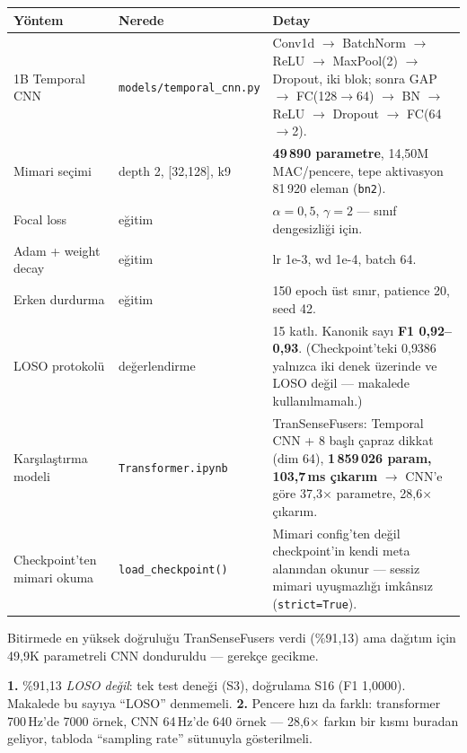 \documentclass[11pt,a4paper]{article}
\newcommand{\ms}{\,ms}
\newcommand{\kod}[1]{\texttt{\small #1}}
\newcommand{\dosya}[1]{\texttt{\footnotesize #1}}
\begin{document}
\begin{longtable}{@{}p{4.0cm}p{2.9cm}p{8.6cm}@{}}
\toprule
\textbf{Yöntem} & \textbf{Nerede} & \textbf{Detay} \\
\midrule
\endhead
1B Temporal CNN & \dosya{models/}\newline\dosya{temporal\_cnn.py} &
Conv1d $\rightarrow$ BatchNorm $\rightarrow$ ReLU $\rightarrow$ MaxPool(2)
$\rightarrow$ Dropout, iki blok; sonra GAP $\rightarrow$ FC(128$\to$64)
$\rightarrow$ BN $\rightarrow$ ReLU $\rightarrow$ Dropout $\rightarrow$ FC(64$\to$2). \\
\addlinespace
Mimari seçimi & depth 2, [32,128], k9 &
\textbf{49\,890 parametre}, 14{,}50M MAC/pencere, tepe aktivasyon 81\,920
eleman (\kod{bn2}). \\
\addlinespace
Focal loss & eğitim & $\alpha=0{,}5$, $\gamma=2$ --- sınıf dengesizliği için. \\
\addlinespace
Adam + weight decay & eğitim & lr 1e-3, wd 1e-4, batch 64. \\
\addlinespace
Erken durdurma & eğitim & 150 epoch üst sınır, patience 20, seed 42. \\
\addlinespace
LOSO protokolü & değerlendirme &
15 katlı. Kanonik sayı \textbf{F1 0{,}92--0{,}93}. (Checkpoint'teki 0{,}9386
yalnızca iki denek üzerinde ve LOSO değil --- makalede kullanılmamalı.) \\
\addlinespace
Karşılaştırma modeli & \dosya{Transformer.ipynb} &
TranSenseFusers: Temporal CNN + 8 başlı çapraz dikkat (dim 64),
\textbf{1\,859\,026 param, 103{,}7\ms{} çıkarım} $\rightarrow$ CNN'e göre
37{,}3$\times$ parametre, 28{,}6$\times$ çıkarım. \\
\addlinespace
Checkpoint'ten mimari okuma & \kod{load\_checkpoint()} &
Mimari config'ten değil checkpoint'in kendi meta alanından okunur ---
sessiz mimari uyuşmazlığı imkânsız (\kod{strict=True}). \\
\bottomrule
\end{longtable}

\begin{uyari}
Bitirmede en yüksek doğruluğu TranSenseFusers verdi (\%91{,}13) ama dağıtım
için 49{,}9K parametreli CNN donduruldu --- gerekçe gecikme.

\textbf{1.} \%91{,}13 \emph{LOSO değil}: tek test deneği (S3), doğrulama S16
(F1 1{,}0000). Makalede bu sayıya ``LOSO'' denmemeli.
\textbf{2.} Pencere hızı da farklı: transformer 700\,Hz'de 7000 örnek, CNN
64\,Hz'de 640 örnek --- 28{,}6$\times$ farkın bir kısmı buradan geliyor,
tabloda ``sampling rate'' sütunuyla gösterilmeli.
\end{uyari}
\end{document}
